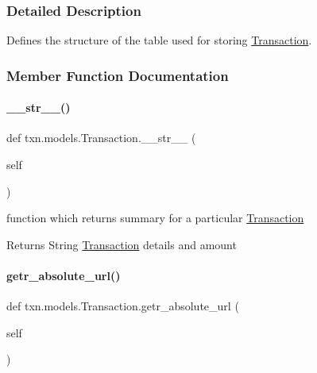 \subsubsection{Detailed Description}
Defines the structure of the table used for storing \hyperlink{classtxn_1_1models_1_1Transaction}{Transaction}. 

\subsubsection{Member Function Documentation}
\mbox{\label{classtxn_1_1models_1_1Transaction_ac893d08a9197f60a0e2161223e568fbe}} 
\paragraph{\texorpdfstring{\+\_\+\+\_\+str\+\_\+\+\_\+()}{\_\_str\_\_()}}
{\footnotesize\ttfamily def txn.\+models.\+Transaction.\+\_\+\+\_\+str\+\_\+\+\_\+ (\begin{DoxyParamCaption}\item[{}]{self }\end{DoxyParamCaption})}



function which returns summary for a particular \hyperlink{classtxn_1_1models_1_1Transaction}{Transaction} 

\begin{DoxyReturn}{Returns}
String \hyperlink{classtxn_1_1models_1_1Transaction}{Transaction} details and amount 
\end{DoxyReturn}
\mbox{\label{classtxn_1_1models_1_1Transaction_a82ad28e5fc95fb68579a7864c2a6b64a}} 
\paragraph{\texorpdfstring{getr\+\_\+absolute\+\_\+url()}{getr\_absolute\_url()}}
{\footnotesize\ttfamily def txn.\+models.\+Transaction.\+getr\+\_\+absolute\+\_\+url (\begin{DoxyParamCaption}\item[{}]{self }\end{DoxyParamCaption})}




